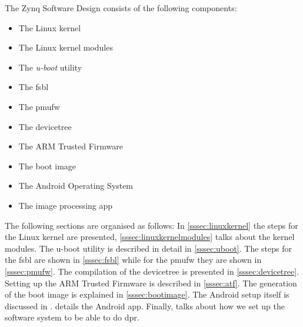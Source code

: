 The Zynq Software Design consists of the following components:
\begin{itemize}
	\item The Linux kernel
	\item The Linux kernel modules
	\item The \emph{u-boot} utility
	\item The \gls{fsbl}
	\item The \gls{pmufw}
	\item The devicetree
	\item The ARM Trusted Firmware
	\item The boot image
	\item The Android Operating System
	\item The image processing app
\end{itemize}

The following sections are organised as follows: In \cref{sssec:linuxkernel} the steps for the Linux kernel are presented, \cref{sssec:linuxkernelmodules} talks about the kernel modules. The u-boot utility is described in detail in \cref{sssec:uboot}. The steps for the \gls{fsbl} are shown in \cref{sssec:fsbl} while for the \gls{pmufw} they are shown in \cref{sssec:pmufw}. The compilation of the devicetree is presented in \cref{sssec:devicetree}. Setting up the ARM Trusted Firmware is described in \cref{sssec:atf}. The generation of the boot image is explained in \cref{sssec:bootimage}. The Android setup itself is discussed in .  details the Android app. Finally,  talks about how we set up
the software system to be able to do \gls{dpr}.
